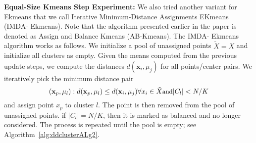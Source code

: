 








\textbf{Equal-Size Kmeans Step Experiment:}  We also tried another variant for Ekmeans that we call Iterative Minimum-Distance Assignments EKmeans (IMDA- Ekmeans).  Note that the algorithm presented earlier in the paper is denoted as Assign and Balance Kmeans (AB-Kmeans).  The IMDA- Ekmeans  algorithm works as follows. We initialize a pool of unassigned points $\tilde{X}  =  X$ and initialize all clusters as empty.  Given the means computed from the previous update steps, we compute the distances $d(\mathbf{x}_i,\mu_j)$ for all points/center pairs. We iteratively pick the minimum distance pair 
\[\small (\mathbf{x}_p,\mu_l)  : d(\mathbf{x}_p,\mu_l) \le d(\mathbf{x}_i,\mu_j)  \forall x_i \in \tilde{X} \text{and}  |C_l| < N/K \]
and assign point $x_p$ to cluster $l$. The point is then removed from the pool of unassigned points. if  $|C_l| = N/K$,  then it is marked as balanced and no longer considered. The process is repeated until the pool is empty; see Algorithm~\ref{alg:ddclusterALg2}. 

